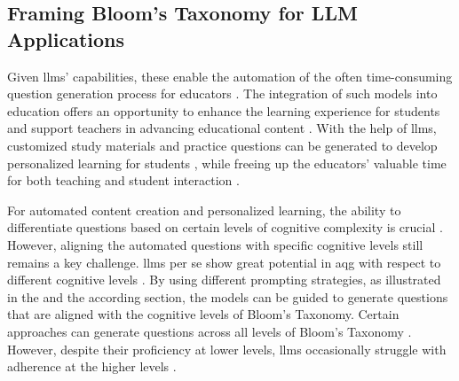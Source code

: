 \vp

\subsection{Framing Bloom's Taxonomy for LLM Applications} \label{sec:blooms-taxonomy}

Given \ac{llms}' capabilities, these enable the automation of the often time-consuming question generation process for educators \cite{vu_chatgpt-based_2024}. The integration of such models into education offers an opportunity to enhance the learning experience for students and support teachers in advancing educational content \cite{naveed_comprehensive_2024}. 
With the help of \ac{llms}, customized study materials and practice questions can be generated to develop personalized learning for students \cite{al_faraby_analysis_2024,bhowmick_automating_2023,hang_mcqgen_2024}, while freeing up the educators' valuable time for both teaching and student interaction \cite{naveed_comprehensive_2024}.

 For automated content creation and personalized learning, the ability to differentiate questions based on certain levels of cognitive complexity is crucial \cite{li_planning_2024,zhuge_twinstar_2025}. However, aligning the automated questions with specific cognitive levels still remains a key challenge. \ac{llms} per se show great potential in \ac{aqg} with respect to different cognitive levels \cite{maity_can_2025,blobstein_angel_2023,duong-trung_bloomllm_2024,scaria_automated_2024,scaria_how_2024}. By using different prompting strategies, as illustrated in the  and the according  section, the models can be guided to generate questions that are aligned with the cognitive levels of Bloom's Taxonomy. Certain approaches can generate questions across all levels of Bloom's Taxonomy \cite{duong-trung_bloomllm_2024,zhuge_twinstar_2025}. However, despite their proficiency at lower levels, \ac{llms} occasionally struggle with adherence at the higher levels \cite{duong-trung_bloomllm_2024,cheng_treequestion_2024,elkins_how_2023}.

